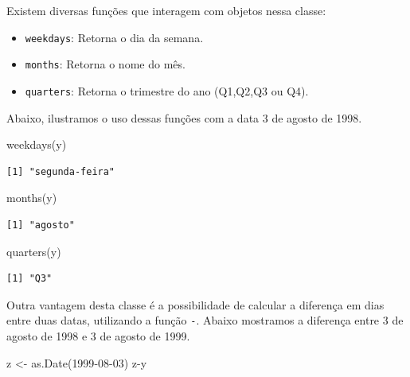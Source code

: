 \documentclass[
  letterpaper,
  DIV=11,
  numbers=noendperiod]{scrreprt}
\newenvironment{Shaded}{\begin{snugshade}}{\end{snugshade}}
\newcommand{\FunctionTok}[1]{\textcolor[rgb]{0.28,0.35,0.67}{#1}}
\newcommand{\NormalTok}[1]{\textcolor[rgb]{0.00,0.23,0.31}{#1}}
\newcommand{\OtherTok}[1]{\textcolor[rgb]{0.00,0.23,0.31}{#1}}
\newcommand{\SpecialCharTok}[1]{\textcolor[rgb]{0.37,0.37,0.37}{#1}}
\newcommand{\StringTok}[1]{\textcolor[rgb]{0.13,0.47,0.30}{#1}}
\begin{document}
Existem diversas funções que interagem com objetos nessa classe:

\begin{itemize}
\item
  \texttt{weekdays}: Retorna o dia da semana.
\item
  \texttt{months}: Retorna o nome do mês.
\item
  \texttt{quarters}: Retorna o trimestre do ano (Q1,Q2,Q3 ou Q4).
\end{itemize}

Abaixo, ilustramos o uso dessas funções com a data 3 de agosto de 1998.

\begin{Shaded}
\begin{Highlighting}[]
\FunctionTok{weekdays}\NormalTok{(y)}
\end{Highlighting}
\end{Shaded}

\begin{verbatim}
[1] "segunda-feira"
\end{verbatim}

\begin{Shaded}
\begin{Highlighting}[]
\FunctionTok{months}\NormalTok{(y)}
\end{Highlighting}
\end{Shaded}

\begin{verbatim}
[1] "agosto"
\end{verbatim}

\begin{Shaded}
\begin{Highlighting}[]
\FunctionTok{quarters}\NormalTok{(y)}
\end{Highlighting}
\end{Shaded}

\begin{verbatim}
[1] "Q3"
\end{verbatim}

Outra vantagem desta classe é a possibilidade de calcular a diferença em
dias entre duas datas, utilizando a função \texttt{-}. Abaixo mostramos
a diferença entre 3 de agosto de 1998 e 3 de agosto de 1999.

\begin{Shaded}
\begin{Highlighting}[]
\NormalTok{z }\OtherTok{\textless{}{-}} \FunctionTok{as.Date}\NormalTok{(}\StringTok{\textquotesingle{}1999{-}08{-}03\textquotesingle{}}\NormalTok{)}
\NormalTok{z}\SpecialCharTok{{-}}\NormalTok{y}
\end{Highlighting}
\end{Shaded}
\end{document}

